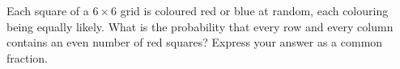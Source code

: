 Each square of a $6\times6$ grid is coloured red or blue at random, each colouring being equally likely. What is the probability that every row and every column contains an even number of red squares? Express your answer as a common fraction.
